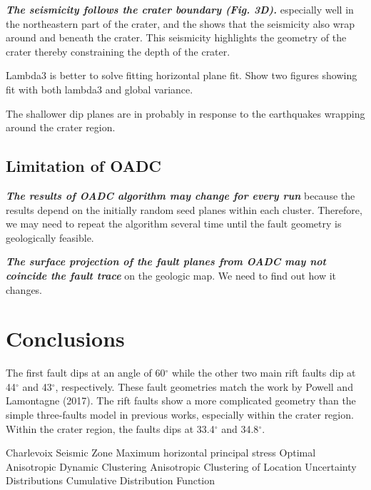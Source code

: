 \documentclass[draft]{agujournal2018}
\begin{document}
\textit{\textbf{The seismicity follows the crater boundary (Fig. 3D).}} especially well in the northeastern part of the crater, and the shows that the seismicity also wrap around and beneath the crater. This seismicity highlights the geometry of the crater thereby constraining the depth of the crater. 


Lambda3 is better to solve fitting horizontal plane fit.
Show two figures showing fit with both lambda3 and global variance.


The shallower dip planes are in probably in response to the earthquakes wrapping around the crater region.




\subsection{Limitation of OADC}
\textit{\textbf{The results of OADC algorithm may change for every run}} because the results depend on the initially random seed planes within each cluster. Therefore, we may need to repeat the algorithm several time until the fault geometry is geologically feasible. 

\textit{\textbf{The surface projection of the fault planes from OADC may not coincide the fault trace}} on the geologic map. We need to find out how it changes.



\section{Conclusions}
The first fault dips at an angle of 60$^\circ$ while the other two main rift faults dip at 44$^\circ$ and 43$^\circ$, respectively. These fault geometries match the work by Powell and Lamontagne (2017). The rift faults show a more complicated geometry than the simple three-faults model in previous works, especially within the crater region. Within the crater region, the faults dips at 33.4$^\circ$ and 34.8$^\circ$. 




















\begin{acronyms}
  Charlevoix Seismic Zone
  Maximum horizontal principal stress 
  Optimal Anisotropic Dynamic Clustering  
   Anisotropic Clustering of Location Uncertainty Distributions
  Cumulative Distribution Function
\end{acronyms}
\end{document}
